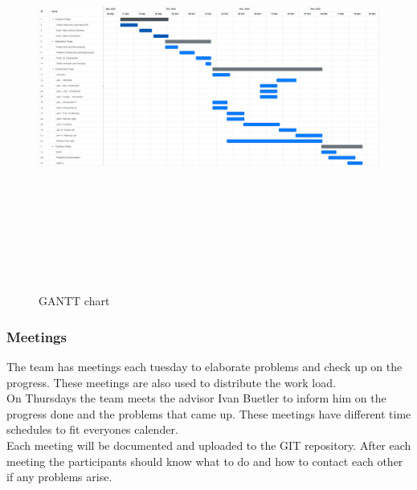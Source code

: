 \begin{figure}[H]
    \centering
    \begin{sideways}
    \includegraphics[width=600pt, height=380pt]{resources/gantt.png}
    \end{sideways}
    \caption{GANTT chart}
    \label{gantt_figure}
\end{figure}



\subsubsection*{Meetings}
The team has meetings each tuesday to elaborate problems and check up on the progress. These meetings are also used to distribute the work load. \\
On Thursdays the team meets the advisor Ivan Buetler to inform him on the progress done and the problems that came up. These meetings have different time schedules to fit everyones calender. \\
Each meeting will be documented and uploaded to the GIT repository. After each meeting the participants should know what to do and how to contact each other if any problems arise.


